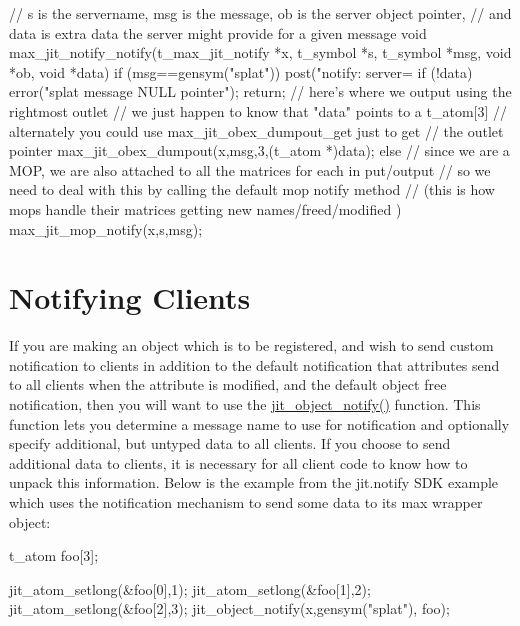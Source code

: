 \begin{DoxyCode}
// s is the servername, msg is the message, ob is the server object pointer, 
// and data is extra data the server might provide for a given message
void max_jit_notify_notify(t_max_jit_notify *x, t_symbol *s, t_symbol *msg, void 
      *ob, void *data)
{
   if (msg==gensym("splat")) {
      post("notify: server=%
      if (!data) {
         error("splat message NULL pointer");
         return;
      }
      // here's where we output using the rightmost outlet
      // we just happen to know that "data" points to a t_atom[3]
      // alternately you could use max_jit_obex_dumpout_get just to get 
      // the outlet pointer
      max_jit_obex_dumpout(x,msg,3,(t_atom *)data); 
   } else {
      // since we are a MOP, we are also attached to all the matrices for each in
      put/output
      // so we need to deal with this by calling the default mop notify method 
      // (this is how mops handle their matrices getting new names/freed/modified
      )
      max_jit_mop_notify(x,s,msg);
   }
}
\end{DoxyCode}
\hypertarget{chapter_jit_notification_chapter_jit_notification_notify}{}\section{Notifying Clients}\label{chapter_jit_notification_chapter_jit_notification_notify}
If you are making an object which is to be registered, and wish to send custom notification to clients in addition to the default notification that attributes send to all clients when the attribute is modified, and the default object free notification, then you will want to use the \hyperlink{group__objectmod_ga4bbd50b2d1e34de44d36e1a66a477b9f}{jit\_\-object\_\-notify()} function. This function lets you determine a message name to use for notification and optionally specify additional, but untyped data to all clients. If you choose to send additional data to clients, it is necessary for all client code to know how to unpack this information. Below is the example from the jit.notify SDK example which uses the notification mechanism to send some data to its max wrapper object:


\begin{DoxyCode}
    t_atom foo[3];
 
    jit_atom_setlong(&foo[0],1);
    jit_atom_setlong(&foo[1],2);
    jit_atom_setlong(&foo[2],3);
    jit_object_notify(x,gensym("splat"), foo);
\end{DoxyCode}
 